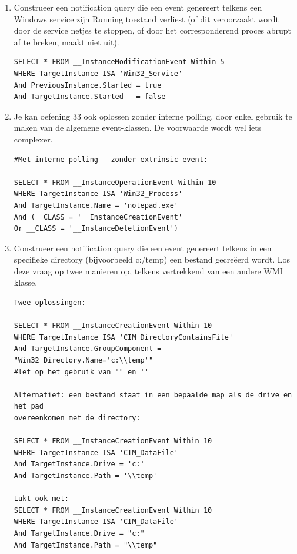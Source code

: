 \documentclass[11pt,a4paper]{report}
\begin{document}
\begin{enumerate}[resume]
	\item Construeer een notification query die een event genereert telkens een Windows service zijn Running toestand verliest (of dit veroorzaakt wordt door de service netjes te stoppen, of door het corresponderend proces abrupt af te breken, maakt niet uit).
	\begin{lstlisting}
SELECT * FROM __InstanceModificationEvent Within 5
WHERE TargetInstance ISA 'Win32_Service'
And PreviousInstance.Started = true
And TargetInstance.Started   = false
	\end{lstlisting}
	\newpage
	\item Je kan oefening 33 ook oplossen zonder interne polling, door enkel gebruik te maken van de algemene event-klassen. De voorwaarde wordt wel iets complexer.
	\begin{lstlisting}
#Met interne polling - zonder extrinsic event:

SELECT * FROM __InstanceOperationEvent Within 10
WHERE TargetInstance ISA 'Win32_Process'
And TargetInstance.Name = 'notepad.exe'
And (__CLASS = '__InstanceCreationEvent'
Or __CLASS = '__InstanceDeletionEvent')
	\end{lstlisting}
	\item Construeer een notification query die een event genereert telkens in een specifieke directory (bijvoorbeeld c:/temp) een bestand gecreëerd wordt. Los deze vraag op twee manieren op, telkens vertrekkend van een andere WMI klasse.
	\begin{lstlisting}
Twee oplossingen:

SELECT * FROM __InstanceCreationEvent Within 10
WHERE TargetInstance ISA 'CIM_DirectoryContainsFile'
And TargetInstance.GroupComponent = "Win32_Directory.Name='c:\\temp'" 
#let op het gebruik van "" en '' 

Alternatief: een bestand staat in een bepaalde map als de drive en het pad 
overeenkomen met de directory:

SELECT * FROM __InstanceCreationEvent Within 10
WHERE TargetInstance ISA 'CIM_DataFile'
And TargetInstance.Drive = 'c:'
And TargetInstance.Path = '\\temp'

Lukt ook met:
SELECT * FROM __InstanceCreationEvent Within 10
WHERE TargetInstance ISA 'CIM_DataFile'
And TargetInstance.Drive = "c:"
And TargetInstance.Path = "\\temp"
	\end{lstlisting}
\end{enumerate}
\end{document}
